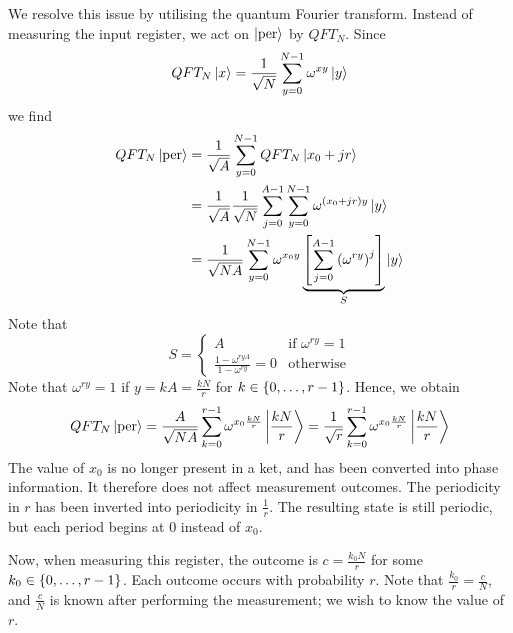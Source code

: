 We resolve this issue by utilising the quantum Fourier transform.
Instead of measuring the input register, we act on \( \ket{\text{per}} \) by \( QFT_N \).
Since
\[ QFT_N\ket{x} = \frac{1}{\sqrt{N}}\sum_{y=0}^{N-1}\omega^{xy} \ket{y} \]
we find
\begin{align*}
    QFT_N \ket{\text{per}} &= \frac{1}{\sqrt{A}}\sum_{y=0}^{N-1} QFT_N \ket{x_0 + jr} \\
    &= \frac{1}{\sqrt{A}} \frac{1}{\sqrt{N}} \sum_{j=0}^{A-1} \sum_{y=0}^{N-1} \omega^{(x_0 + jr)y} \ket{y} \\
    &= \frac{1}{\sqrt{NA}} \sum_{y=0}^{N-1} \omega^{x_0 y} \underbrace{\qty[\sum_{j=0}^{A-1} \qty(\omega^{ry})^j]}_S \ket{y}
\end{align*}
Note that
\[ S = \begin{cases}
    A & \text{if } \omega^{ry} = 1 \\
    \frac{1 - \omega^{ryA}}{1 - \omega^{ry}} = 0 & \text{otherwise}
\end{cases} \]
Note that \( \omega^{ry} = 1 \) if \( y = kA = \frac{kN}{r} \) for \( k \in \qty{0, \dots, r - 1} \).
Hence, we obtain
\[ QFT_N \ket{\text{per}} = \frac{A}{\sqrt{NA}} \sum_{k=0}^{r-1} \omega^{x_0 \frac{kN}{r}} \ket{\frac{kN}{r}} = \frac{1}{\sqrt{r}} \sum_{k=0}^{r-1} \omega^{x_0 \frac{kN}{r}} \ket{\frac{kN}{r}} \]
The value of \( x_0 \) is no longer present in a ket, and has been converted into phase information.
It therefore does not affect measurement outcomes.
The periodicity in \( r \) has been inverted into periodicity in \( \frac{1}{r} \).
The resulting state is still periodic, but each period begins at 0 instead of \( x_0 \).

Now, when measuring this register, the outcome is \( c = \frac{k_0N}{r} \) for some \( k_0 \in \qty{0, \dots, r-1} \).
Each outcome occurs with probability \( r \).
Note that \( \frac{k_0}{r} = \frac{c}{N} \), and \( \frac{c}{N} \) is known after performing the measurement; we wish to know the value of \( r \).

